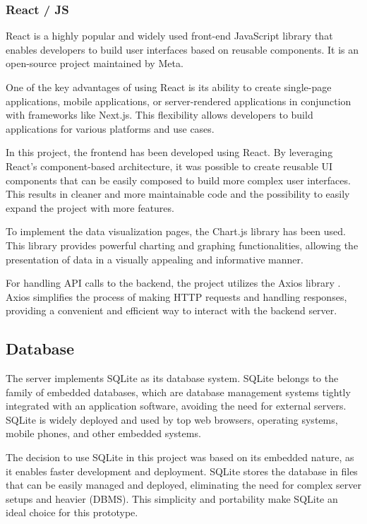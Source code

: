 \documentclass[a4paper, 11pt]{article}
\begin{document}
\subsubsection{React / JS}
React \cite{react} is a highly popular and widely used front-end JavaScript library that enables developers to build user interfaces based on reusable components. It is an open-source project maintained by Meta.

One of the key advantages of using React is its ability to create single-page applications, mobile applications, or server-rendered applications in conjunction with frameworks like Next.js. This flexibility allows developers to build applications for various platforms and use cases.

In this project, the frontend has been developed using React. By leveraging React's component-based architecture, it was possible to create reusable UI components that can be easily composed to build more complex user interfaces. This results in cleaner and more maintainable code and the possibility to easily expand the project with more features.

To implement the data visualization pages, the Chart.js library \cite{chartjs} has been used. This library provides powerful charting and graphing functionalities, allowing the presentation of data in a visually appealing and informative manner.

For handling API calls to the backend, the project utilizes the Axios library \cite{axios}. Axios simplifies the process of making HTTP requests and handling responses, providing a convenient and efficient way to interact with the backend server.

\subsection{Database}
The server implements SQLite \cite{sqlite} as its database system. SQLite belongs to the family of embedded databases, which are database management systems tightly integrated with an application software, avoiding the need for external servers. SQLite is widely deployed and used by top web browsers, operating systems, mobile phones, and other embedded systems.

The decision to use SQLite in this project was based on its embedded nature, as it enables faster development and deployment. SQLite stores the database in files that can be easily managed and deployed, eliminating the need for complex server setups and heavier (DBMS). This simplicity and portability make SQLite an ideal choice for this prototype.
\end{document}
